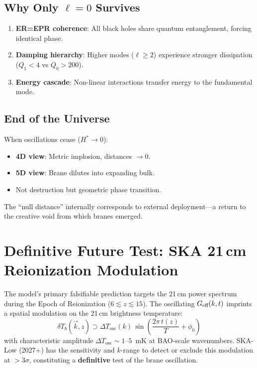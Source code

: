 \subsection{Why Only $\ell=0$ Survives}

\begin{enumerate}
  \item \textbf{ER=EPR coherence}: All black holes share quantum entanglement, forcing identical phase.
  \item \textbf{Damping hierarchy}: Higher modes ($\ell \ge 2$) experience stronger dissipation ($Q_1 < 4$ vs $Q_0 > 200$).
  \item \textbf{Energy cascade}: Non-linear interactions transfer energy to the fundamental mode.
\end{enumerate}

\subsection{End of the Universe}

When oscillations cease ($H^* \to 0$):
\begin{itemize}
  \item \textbf{4D view}: Metric implosion, distances $\to 0$.
  \item \textbf{5D view}: Brane dilutes into expanding bulk.
  \item Not destruction but geometric phase transition.
\end{itemize}

The ``null distance'' internally corresponds to external deployment---a return to the creative void from which branes emerged.

\section{Definitive Future Test: SKA 21\,cm Reionization Modulation}
\label{sec:ska}

The model's primary falsifiable prediction targets the 21\,cm power spectrum during the Epoch of Reionization ($6 \lesssim z \lesssim 15$). The oscillating $G_\text{eff}(k,t)$ imprints a spatial modulation on the 21\,cm brightness temperature:
\begin{equation}
\delta T_b(\vec{k}, z) \supset \Delta T_\text{osc}(k)\, \sin\!\left(\frac{2\pi\, t(z)}{T} + \phi_0\right)
\end{equation}
with characteristic amplitude $\Delta T_\text{osc} \sim 1$--$5$~mK at BAO-scale wavenumbers. SKA-Low (2027+) has the sensitivity and $k$-range to detect or exclude this modulation at $> 3\sigma$, constituting a \textbf{definitive} test of the brane oscillation.

